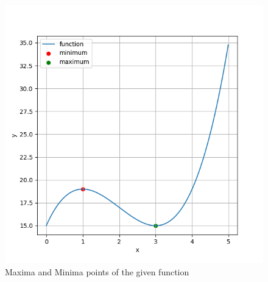 \documentclass[journal]{IEEEtran}
\begin{document}
\begin{figure}[H]
    \centering
    \includegraphics[width=\columnwidth]{plots/plot.png}
    \caption{Maxima and Minima points of the given function}
    \label{fig:Plot1}
    \end{figure}
\end{document}
